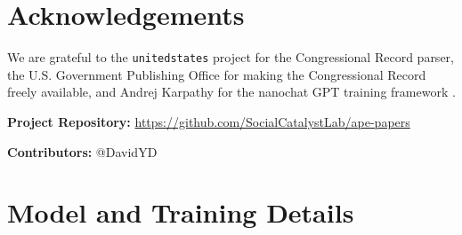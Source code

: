 \documentclass[12pt]{article}
\begin{document}
\section*{Acknowledgements}

We are grateful to the \texttt{unitedstates} project for the Congressional Record parser, the U.S. Government Publishing Office for making the Congressional Record freely available, and Andrej Karpathy for the nanochat GPT training framework \citep{karpathy2025}.

\noindent\textbf{Project Repository:} \url{https://github.com/SocialCatalystLab/ape-papers}

\noindent\textbf{Contributors:} @DavidYD

\label{apep_main_text_end}
\newpage


\newpage
\appendix

\section{Model and Training Details}
\label{app:training}
\end{document}

